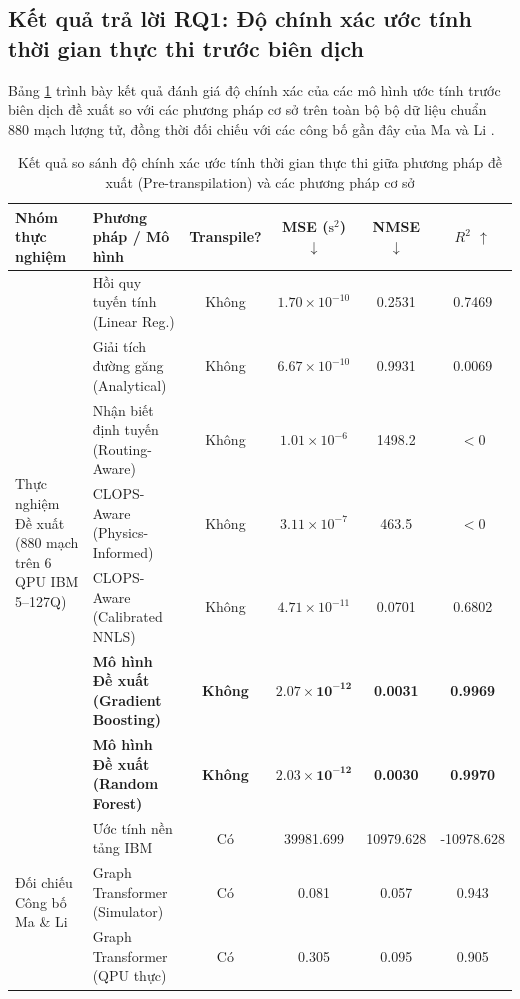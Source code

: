 \documentclass[11pt, a4paper]{article}
\begin{document}
\subsection{Kết quả trả lời RQ1: Độ chính xác ước tính thời gian thực thi trước biên dịch}
Bảng \ref{tab:rq1_results} trình bày kết quả đánh giá độ chính xác của các mô hình ước tính trước biên dịch đề xuất so với các phương pháp cơ sở trên toàn bộ bộ dữ liệu chuẩn 880 mạch lượng tử, đồng thời đối chiếu với các công bố gần đây của Ma và Li \cite{ma2025understanding}.

\begin{table}[htbp]
\centering
\caption{Kết quả so sánh độ chính xác ước tính thời gian thực thi giữa phương pháp đề xuất (Pre-transpilation) và các phương pháp cơ sở}
\label{tab:rq1_results}
\small
\begin{tabularx}{\textwidth}{p{2.6cm} >{\raggedright\arraybackslash}X c c c c}
\toprule
\textbf{Nhóm thực nghiệm} & \textbf{Phương pháp / Mô hình} & \textbf{Transpile?} & \textbf{MSE ($\text{s}^2$) $\downarrow$} & \textbf{NMSE $\downarrow$} & \textbf{$R^2$ $\uparrow$} \\
\midrule
\multirow{7}{=}{Thực nghiệm Đề xuất (880 mạch trên 6 QPU IBM 5--127Q)} 
 & Hồi quy tuyến tính (Linear Reg.) & Không & $1.70 \times 10^{-10}$ & 0.2531 & 0.7469 \\
 & Giải tích đường găng (Analytical) & Không & $6.67 \times 10^{-10}$ & 0.9931 & 0.0069 \\
 & Nhận biết định tuyến (Routing-Aware) & Không & $1.01 \times 10^{-6}$ & 1498.2 & $<0$ \\
 & CLOPS-Aware (Physics-Informed) & Không & $3.11 \times 10^{-7}$ & 463.5 & $<0$ \\
 & CLOPS-Aware (Calibrated NNLS) & Không & $4.71 \times 10^{-11}$ & 0.0701 & 0.6802 \\
 & \textbf{Mô hình Đề xuất (Gradient Boosting)} & \textbf{Không} & $\mathbf{2.07 \times 10^{-12}}$ & \textbf{0.0031} & \textbf{0.9969} \\
 & \textbf{Mô hình Đề xuất (Random Forest)} & \textbf{Không} & $\mathbf{2.03 \times 10^{-12}}$ & \textbf{0.0030} & \textbf{0.9970} \\
\midrule
\multirow{3}{=}{Đối chiếu Công bố Ma \& Li \cite{ma2025understanding}} 
 & Ước tính nền tảng IBM \cite{ma2025understanding} & Có & 39981.699 & 10979.628 & -10978.628 \\
 & Graph Transformer (Simulator) \cite{ma2025understanding} & Có & 0.081 & 0.057 & 0.943 \\
 & Graph Transformer (QPU thực) \cite{ma2025understanding} & Có & 0.305 & 0.095 & 0.905 \\
\bottomrule
\end{tabularx}
\end{table}
\end{document}

